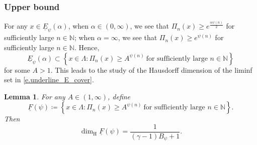 \documentclass[12pt,reqno]{amsart}
\renewcommand{\=}{\coloneqq}
\theoremstyle{plain}
\newtheorem{lemma}[theorem]{Lemma}
\begin{document}
\subsubsection{Upper bound}
For any $x\in \underline{E}_{\psi}(\alpha)$, when $\alpha\in (0,\infty)$, we see that $\Pi_n(x)\geq e^{\frac{\alpha \psi(n)}{2}}$ for sufficiently large $n \in \mathbb N$; when $\alpha=\infty$, we see that $\Pi_n(x)\geq e^{\psi(n)}$ for sufficiently large $n \in \mathbb N$. Hence,
\begin{equation}\label{e.underline_E_cover}
\underline{E}_{\psi}(\alpha)\subset\left\{x\in \Lambda:\Pi_{n}(x)\geq A^{\psi(n)}\ \text{for sufficiently large $n \in \mathbb N$} \right\}
\end{equation}
for some $A>1$. This leads to the study of the Hausdorff dimension of the liminf set in \eqref{e.underline_E_cover}.


\begin{lemma}\label{l.Hausdorff_dimension_under_F_psi}
     For any $A\in(1,\infty)$, define
     \begin{equation*}\label{e.def_under_F_psi}
        \underline{F}(\psi)\coloneqq
        \left\{
        x\in \Lambda:
        \Pi_{n}(x)\geq A^{\psi(n)}
       \ \text{for sufficiently large $n \in \mathbb N$}
        \right\}.
     \end{equation*}
     Then
     \begin{equation*}
        \dim_{\mathrm{H}}\underline{F}(\psi)
        =\frac{1}{(\gamma-1)B_\psi+1}.
     \end{equation*}
\end{lemma}
\end{document}
